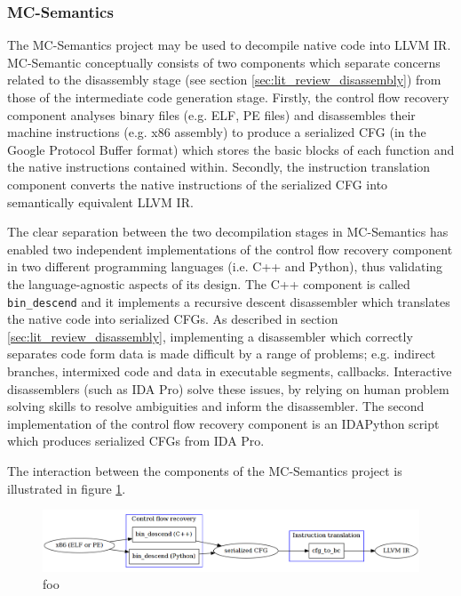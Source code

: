 
\subsubsection{MC-Semantics}
\label{sec:rel_work_mc-semantics}

The MC-Semantics project may be used to decompile native code into LLVM IR. MC-Semantic conceptually consists of two components which separate concerns related to the disassembly stage (see section \ref{sec:lit_review_disassembly}) from those of the intermediate code generation stage. Firstly, the control flow recovery component analyses binary files (e.g. ELF, PE files) and disassembles their machine instructions (e.g. x86 assembly) to produce a serialized CFG (in the Google Protocol Buffer format) which stores the basic blocks of each function and the native instructions contained within. Secondly, the instruction translation component converts the native instructions of the serialized CFG into semantically equivalent LLVM IR.

The clear separation between the two decompilation stages in MC-Semantics has enabled two independent implementations of the control flow recovery component in two different programming languages (i.e. C++ and Python), thus validating the language-agnostic aspects of its design. The C++ component is called \texttt{bin\_descend} and it implements a recursive descent disassembler which translates the native code into serialized CFGs. As described in section \ref{sec:lit_review_disassembly}, implementing a disassembler which correctly separates code form data is made difficult by a range of problems; e.g. indirect branches, intermixed code and data in executable segments, callbacks. Interactive disassemblers (such as IDA Pro) solve these issues, by relying on human problem solving skills to resolve ambiguities and inform the disassembler. The second implementation of the control flow recovery component is an IDAPython script which produces serialized CFGs from IDA Pro.

The interaction between the components of the MC-Semantics project is illustrated in figure \ref{fig:mcsema_overview}.

\begin{figure}[htbp]
	\includegraphics[width=\textwidth]{inc/3_rel_work/mcsema_overview.png}
	\caption{foo}
	\label{fig:mcsema_overview}
\end{figure}

